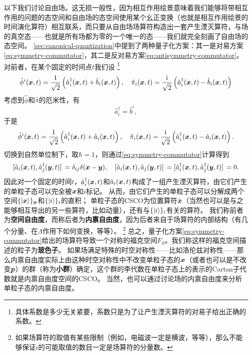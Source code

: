 \documentclass[UTF8, a4paper]{ctexart}
\newcommand*{\ii}{\mathrm{i}}
\begin{document}
以下我们讨论自由场。这无损一般性，因为相互作用绘景意味着我们能够将带相互作用的问题的态空间和自由场的态空间使用某个幺正变换（也就是相互作用绘景的时间演化算符）相互联系，而只要从自由场场算符构造出一套产生湮灭算符，与场的真空态——也就是所有场都为零的一个唯一的态——我们就完全刻画了自由场的态空间。
\autoref{sec:canonical-quantization}中提到了两种量子化方案：其一是对易方案\eqref{eq:symmetry-commutator}，其二是反对易方案\eqref{eq:antisymmetry-commutator}。
对前者，在某个固定的时间点$t$我们设
%
\footnote{具体系数是多少无关紧要，系数只是为了让产生湮灭算符的对易子给出正确的系数。}
\[
    \hat{\phi}^i(\vb*{x}, t) = \frac{1}{\sqrt{2}} \left( \hat{a}_i^\dagger (\vb*{x}, t) + \hat{b}_i(\vb*{x}, t) \right), \quad 
    \hat{\pi}_i(\vb*{x}, t) = \frac{\ii}{\sqrt{2}} \left( \hat{a}_i^\dagger (\vb*{x}, t) - \hat{b}_i (\vb*{x}, t) \right)
\]
考虑到$\hat{\phi}$和$\hat{\pi}$的厄米性，有
\[
    \hat{a}_i^\dagger = \hat{b}^i,
\]
于是
\begin{equation}
    \hat{\phi}^i(\vb*{x}, t) = \frac{1}{\sqrt{2}} \left( \hat{a}_i^\dagger (\vb*{x}, t) + \hat{a}_i(\vb*{x}, t) \right), \quad 
    \hat{\pi}_i(\vb*{x}, t) = \frac{\ii}{\sqrt{2}} \left( \hat{a}_i^\dagger (\vb*{x}, t) - \hat{a}_i (\vb*{x}, t) \right).
\end{equation}
切换到自然单位制下，取$\hbar=1$，则通过\eqref{eq:symmetry-commutator}计算得到
\begin{equation}
    \comm*{\hat{a}_i(\vb*{x}, t)}{\hat{a}_j^\dagger (\vb*{y}, t)} = \delta_{ij} \delta (\vb*{x} - \vb*{y}), \quad \comm*{\hat{a}_i(\vb*{x}, t)}{\hat{a}_j(\vb*{y}, t)} = \comm*{\hat{a}_i^\dagger (\vb*{x}, t)}{\hat{a}_j^\dagger (\vb*{y}, t)} = 0.
    \label{eq:ca-op-from-field}
\end{equation}
因此对一个固定的时间$t$，$\hat{a}_i^\dagger(\vb*{x}, t)$和$\hat{a}_i (\vb*{x}, t)$构成了一组产生湮灭算符，由它们产生的单粒子态可以完全被$\vb*{x}$和$i$标记。
从而，由它们产生的单粒子态可以分解成两个空间$\{\ket{\vb*{x}}\}_{\vb*{x}}$和$\{\ket{i}\}_i$的直积；
单粒子态的CSCO为位置算符$\hat{\vb*{x}}$（当然也可以是与之能够相互导出的另一些算符，比如动量），还有与$\{\ket{i}\}_i$有关的算符。
我们称前者为\textbf{空间自由度}，而称后者为\textbf{内禀自由度}，因为后者来自于场算符的内部结构（有几个分量、在$\Lambda$作用下如何变换，等等）。%
\footnote{如果场算符的取值有某些限制（例如，电磁波一定是横波，等等），那么不能够保证$i$的可能取值的数目一定是场算符的分量数。}
总之，量子化方案\eqref{eq:symmetry-commutator}给出的场算符导致一个对称的福克空间$F_S$。我们称这样的福克空间描述的粒子为\textbf{玻色子}。
如果场满足特殊的时空对称性——比如洛伦兹对称性——那么内禀自由度实际上由这种时空对称性中不改变单粒子态的$\vb*{x}$（或者也可以是不改变$\vb*{p}$）的群（称为\textbf{小群}）确定，这个群的李代数在单粒子态上的表示的Cartan子代数就是内禀自由度空间的CSCO。
当然，也可以通过讨论场的内禀自由度来分析单粒子态的内禀自由度。
\end{document}
